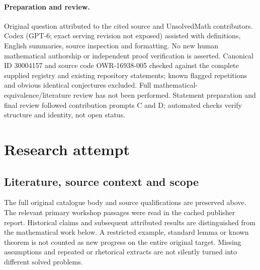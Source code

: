 \documentclass[11pt]{article}
\begin{document}
\paragraph{Preparation and review.}
Original question attributed to the cited source and UnsolvedMath contributors. Codex (GPT-6; exact serving revision not exposed) assisted with definitions, English summaries, source inspection and formatting. No new human mathematical authorship or independent proof verification is asserted. Canonical ID 30004157 and source code OWR-16938-005 checked against the complete supplied registry and existing repository statements; known flagged repetitions and obvious identical conjectures excluded. Full mathematical-equivalence/literature review has not been performed. Statement preparation and final review followed contribution prompts C and D; automated checks verify structure and identity, not open status.
\label{end:30004157}

\section{Research attempt}
\subsection{Literature, source context and scope}
The full original catalogue body and source qualifications are preserved above. The relevant primary workshop passages were read in the cached publisher report. Historical claims and subsequent attributed results are distinguished from the mathematical work below. A restricted example, standard lemma or known theorem is not counted as new progress on the entire original target. Missing assumptions and repeated or rhetorical extracts are not silently turned into different solved problems.
\end{document}

